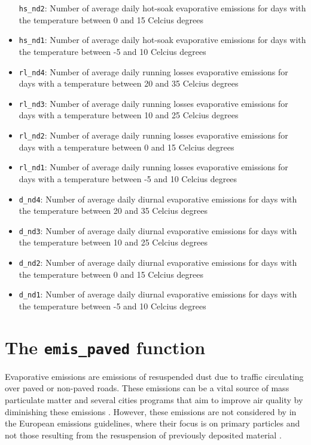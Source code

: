 \documentclass[12pt,graybox,envcountchap,sectrefs]{krantz}
\theoremstyle{definition}
\theoremstyle{definition}
\theoremstyle{definition}
\theoremstyle{remark}
\begin{document}
\begin{itemize}
  \texttt{hs\_nd2}: Number of average daily hot-soak evaporative
  emissions for days with the temperature between 0 and 15 Celcius
  degrees
\item
  \texttt{hs\_nd1}: Number of average daily hot-soak evaporative
  emissions for days with the temperature between -5 and 10 Celcius
  degrees
\item
  \texttt{rl\_nd4}: Number of average daily running losses evaporative
  emissions for days with a temperature between 20 and 35 Celcius
  degrees
\item
  \texttt{rl\_nd3}: Number of average daily running losses evaporative
  emissions for days with a temperature between 10 and 25 Celcius
  degrees
\item
  \texttt{rl\_nd2}: Number of average daily running losses evaporative
  emissions for days with a temperature between 0 and 15 Celcius degrees
\item
  \texttt{rl\_nd1}: Number of average daily running losses evaporative
  emissions for days with a temperature between -5 and 10 Celcius
  degrees
\item
  \texttt{d\_nd4}: Number of average daily diurnal evaporative emissions
  for days with the temperature between 20 and 35 Celcius degrees
\item
  \texttt{d\_nd3}: Number of average daily diurnal evaporative emissions
  for days with the temperature between 10 and 25 Celcius degrees
\item
  \texttt{d\_nd2}: Number of average daily diurnal evaporative emissions
  for days with the temperature between 0 and 15 Celcius degrees
\item
  \texttt{d\_nd1}: Number of average daily diurnal evaporative emissions
  for days with the temperature between -5 and 10 Celcius degrees
\end{itemize}

\section{\texorpdfstring{The \texttt{emis\_paved}
function}{The emis\_paved function}}\label{the-emis_paved-function}

Evaporative emissions are emissions of resuspended dust due to traffic
circulating over paved or non-paved roads. These emissions can be a
vital source of mass particulate matter and several cities programs that
aim to improve air quality by diminishing these emissions
\citep{AMATO20103070}. However, these emissions are not considered by in
the European emissions guidelines, where their focus is on primary
particles and not those resulting from the resuspension of previously
deposited material \citep{NtziachristosBoulter2009}.
\end{document}
